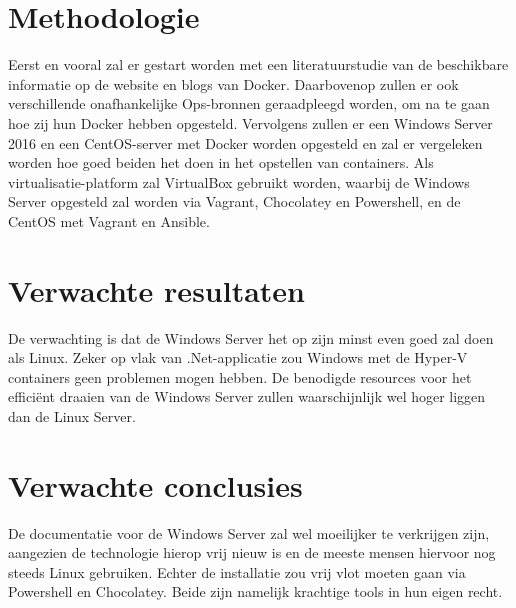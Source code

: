 \section{Methodologie}
\label{sec:methodologie}

Eerst en vooral zal er gestart worden met een literatuurstudie van de beschikbare informatie op de website en blogs van Docker. Daarbovenop zullen er ook verschillende onafhankelijke Ops-bronnen geraadpleegd worden, om na te gaan hoe zij hun Docker hebben opgesteld.
Vervolgens zullen er een Windows Server 2016 en een CentOS-server met Docker worden opgesteld en zal er vergeleken worden hoe goed beiden het doen in het opstellen van containers.
Als virtualisatie-platform zal VirtualBox gebruikt worden, waarbij de Windows Server opgesteld zal worden via Vagrant, Chocolatey en Powershell, en de CentOS met Vagrant en Ansible.

\section{Verwachte resultaten}
\label{sec:verwachte_resultaten}

De verwachting is dat de Windows Server het op zijn minst even goed zal doen als Linux. Zeker op vlak van .Net-applicatie zou Windows met de Hyper-V containers geen problemen mogen hebben.
De benodigde resources voor het efficiënt draaien van de Windows Server zullen waarschijnlijk wel hoger liggen dan de Linux Server.

\section{Verwachte conclusies}
\label{sec:verwachte_conclusies}

De documentatie voor de Windows Server zal wel moeilijker te verkrijgen zijn, aangezien de technologie hierop vrij nieuw is en de meeste mensen hiervoor nog steeds Linux gebruiken.
Echter de installatie zou vrij vlot moeten gaan via Powershell en Chocolatey. Beide zijn namelijk krachtige tools in hun eigen recht.

